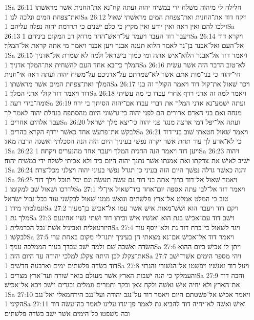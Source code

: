 1Sa 26:11  חלילה לי מיהוה משׁלח ידי במשׁיח יהוה ועתה קח־נא את־החנית אשׁר מראשׁתו ואת־צפחת המים ונלכה לנו׃
1Sa 26:12  ויקח דוד את־החנית ואת־צפחת המים מראשׁתי שׁאול וילכו להם ואין ראה ואין יודע ואין מקיץ כי כלם ישׁנים כי תרדמת יהוה נפלה עליהם׃
1Sa 26:13  ויעבר דוד העבר ויעמד על־ראשׁ־ההר מרחק רב המקום ביניהם׃
1Sa 26:14  ויקרא דוד אל־העם ואל־אבנר בן־נר לאמר הלוא תענה אבנר ויען אבנר ויאמר מי אתה קראת אל־המלך׃
1Sa 26:15  ויאמר דוד אל־אבנר הלוא־אישׁ אתה ומי כמוך בישׂראל ולמה לא שׁמרת אל־אדניך המלך כי־בא אחד העם להשׁחית את־המלך אדניך׃
1Sa 26:16  לא־טוב הדבר הזה אשׁר עשׂית חי־יהוה כי בני־מות אתם אשׁר לא־שׁמרתם על־אדניכם על־משׁיח יהוה ועתה ראה אי־חנית המלך ואת־צפחת המים אשׁר מראשׁתו׃
1Sa 26:17  ויכר שׁאול את־קול דוד ויאמר הקולך זה בני דוד ויאמר דוד קולי אדני המלך׃
1Sa 26:18  ויאמר למה זה אדני רדף אחרי עבדו כי מה עשׂיתי ומה־בידי רעה׃
1Sa 26:19  ועתה ישׁמע־נא אדני המלך את דברי עבדו אם־יהוה הסיתך בי ירח מנחה ואם בני האדם ארורים הם לפני יהוה כי־גרשׁוני היום מהסתפח בנחלת יהוה לאמר לך עבד אלהים אחרים׃
1Sa 26:20  ועתה אל־יפל דמי ארצה מנגד פני יהוה כי־יצא מלך ישׂראל לבקשׁ את־פרעשׁ אחד כאשׁר ירדף הקרא בהרים׃
1Sa 26:21  ויאמר שׁאול חטאתי שׁוב בני־דוד כי לא־ארע לך עוד תחת אשׁר יקרה נפשׁי בעיניך היום הזה הנה הסכלתי ואשׁגה הרבה מאד׃
1Sa 26:22  ויען דוד ויאמר הנה החנית המלך ויעבר אחד מהנערים ויקחה׃
1Sa 26:23  ויהוה ישׁיב לאישׁ את־צדקתו ואת־אמנתו אשׁר נתנך יהוה היום ביד ולא אביתי לשׁלח ידי במשׁיח יהוה׃
1Sa 26:24  והנה כאשׁר גדלה נפשׁך היום הזה בעיני כן תגדל נפשׁי בעיני יהוה ויצלני מכל־צרה׃
1Sa 26:25  ויאמר שׁאול אל־דוד ברוך אתה בני דוד גם עשׂה תעשׂה וגם יכל תוכל וילך דוד לדרכו ושׁאול שׁב למקומו׃
1Sa 27:1  ויאמר דוד אל־לבו עתה אספה יום־אחד ביד־שׁאול אין־לי טוב כי המלט אמלט אל־ארץ פלשׁתים ונואשׁ ממני שׁאול לבקשׁני עוד בכל־גבול ישׂראל ונמלטתי מידו׃
1Sa 27:2  ויקם דוד ויעבר הוא ושׁשׁ־מאות אישׁ אשׁר עמו אל־אכישׁ בן־מעוך מלך גת׃
1Sa 27:3  וישׁב דוד עם־אכישׁ בגת הוא ואנשׁיו אישׁ וביתו דוד ושׁתי נשׁיו אחינעם היזרעאלית ואביגיל אשׁת־נבל הכרמלית׃
1Sa 27:4  ויגד לשׁאול כי־ברח דוד גת ולא־יוסף עוד לבקשׁו׃
1Sa 27:5  ויאמר דוד אל־אכישׁ אם־נא מצאתי חן בעיניך יתנו־לי מקום באחת ערי השׂדה ואשׁבה שׁם ולמה ישׁב עבדך בעיר הממלכה עמך׃
1Sa 27:6  ויתן־לו אכישׁ ביום ההוא את־צקלג לכן היתה צקלג למלכי יהודה עד היום הזה׃
1Sa 27:7  ויהי מספר הימים אשׁר־ישׁב דוד בשׂדה פלשׁתים ימים וארבעה חדשׁים׃
1Sa 27:8  ויעל דוד ואנשׁיו ויפשׁטו אל־הגשׁורי והגרזי והעמלקי כי הנה ישׁבות הארץ אשׁר מעולם בואך שׁורה ועד־ארץ מצרים׃
1Sa 27:9  והכה דוד את־הארץ ולא יחיה אישׁ ואשׁה ולקח צאן ובקר וחמרים וגמלים ובגדים וישׁב ויבא אל־אכישׁ׃
1Sa 27:10  ויאמר אכישׁ אל־פשׁטתם היום ויאמר דוד על־נגב יהודה ועל־נגב הירחמאלי ואל־נגב הקיני׃
1Sa 27:11  ואישׁ ואשׁה לא־יחיה דוד להביא גת לאמר פן־יגדו עלינו לאמר כה־עשׂה דוד וכה משׁפטו כל־הימים אשׁר ישׁב בשׂדה פלשׁתים׃
